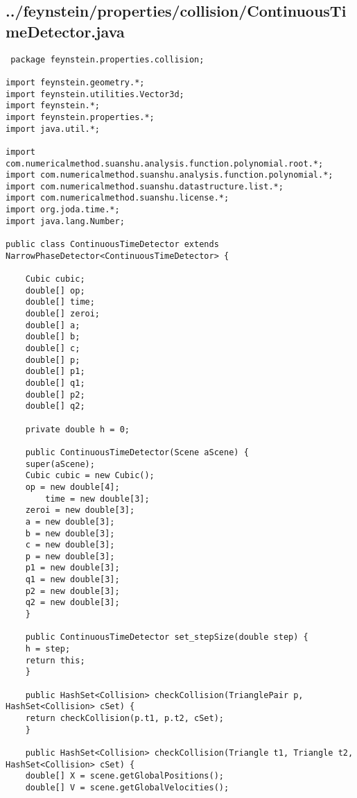 \subsection*{../feynstein/properties/collision/ContinuousTimeDetector.java}
\begin{lstlisting}
 package feynstein.properties.collision;

import feynstein.geometry.*;
import feynstein.utilities.Vector3d;
import feynstein.*;
import feynstein.properties.*;
import java.util.*;

import com.numericalmethod.suanshu.analysis.function.polynomial.root.*;
import com.numericalmethod.suanshu.analysis.function.polynomial.*;
import com.numericalmethod.suanshu.datastructure.list.*;
import com.numericalmethod.suanshu.license.*;
import org.joda.time.*;
import java.lang.Number;

public class ContinuousTimeDetector extends NarrowPhaseDetector<ContinuousTimeDetector> {

    Cubic cubic;
    double[] op;
    double[] time;
    double[] zeroi;
    double[] a;
    double[] b;
    double[] c;
    double[] p;
    double[] p1;
    double[] q1;
    double[] p2;
    double[] q2;

    private double h = 0;      

    public ContinuousTimeDetector(Scene aScene) {
	super(aScene);
	Cubic cubic = new Cubic();
	op = new double[4];
        time = new double[3];
	zeroi = new double[3];
	a = new double[3];
	b = new double[3];
	c = new double[3];
	p = new double[3];
	p1 = new double[3];
	q1 = new double[3];
	p2 = new double[3];
	q2 = new double[3];
    }

    public ContinuousTimeDetector set_stepSize(double step) {
	h = step;
	return this;
    }
    
    public HashSet<Collision> checkCollision(TrianglePair p, HashSet<Collision> cSet) {
	return checkCollision(p.t1, p.t2, cSet);
    }

    public HashSet<Collision> checkCollision(Triangle t1, Triangle t2, HashSet<Collision> cSet) {
	double[] X = scene.getGlobalPositions();
	double[] V = scene.getGlobalVelocities();


\end{lstlisting}
